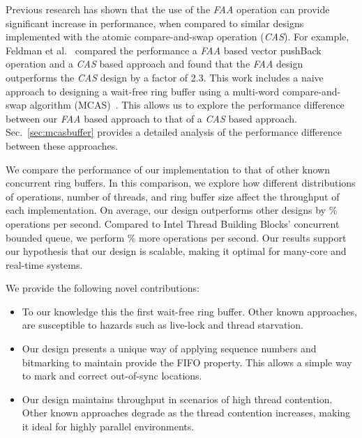 Previous research has shown that the use of the \emph{FAA} operation can provide significant increase in performance, when compared to similar designs implemented with the atomic compare-and-swap operation (\emph{CAS}).
For example, Feldman et al.~\cite{feldman_vector} compared the performance a \emph{FAA} based vector pushBack operation and a \emph{CAS} based approach and found that the \emph{FAA} design outperforms the \emph{CAS} design by a factor of 2.3.
This work includes a naive approach to designing a wait-free ring buffer using a multi-word compare-and-swap algorithm (MCAS)~\cite{feldman_mcas}.
This allows us to explore the performance difference between our \emph{FAA} based approach to that of a \emph{CAS} based approach.
Sec.~\ref{sec:mcasbuffer} provides a detailed analysis of the performance difference between these approaches.

We compare the performance of our implementation to that of other known concurrent ring buffers.
In this comparison, we explore how different distributions of operations, number of threads, and ring buffer size affect the throughput of each implementation.
On average, our design outperforms other designs by \% operations per second.
Compared to Intel Thread Building Blocks' concurrent bounded queue, we perform \% more operations per second.
Our results support our hypothesis that our design is scalable, making it optimal for many-core and real-time systems.

We provide the following novel contributions:
\begin{itemize}
\item To our knowledge this the first wait-free ring buffer.
Other known approaches, are susceptible to hazards such as live-lock and thread starvation.

\item Our design presents a unique way of applying sequence numbers and bitmarking to maintain provide the FIFO property.
This allows a simple way to mark and correct out-of-sync locations.


\item Our design maintains throughput in scenarios of high thread contention.
Other known approaches degrade as the thread contention increases, making it ideal for highly parallel environments.


\end{itemize}
